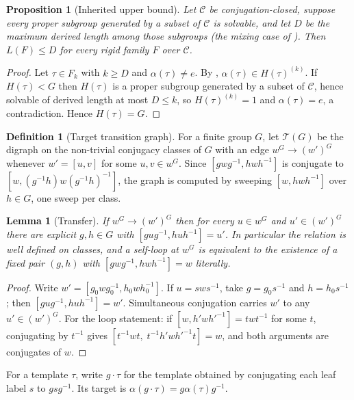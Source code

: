 \documentclass[11pt]{amsart}
\newtheorem{lemma}[lemma]{Lemma}
\newtheorem{proposition}[proposition]{Proposition}
\theoremstyle{definition}
\newtheorem{definition}[definition]{Definition}
\theoremstyle{remark}
\theoremstyle{plain}
\theoremstyle{plain}
\numberwithin{equation}{section}
\begin{document}
\begin{proposition}[Inherited upper bound]
\label{prop:rigidupper}
Let $\mathcal{C}$ be conjugation-closed, suppose every proper subgroup generated by a subset of
$\mathcal{C}$ is solvable, and let $D$ be the maximum derived length among those subgroups (the
mixing case of ). Then $L(F)\le D$ for every rigid family $F$ over
$\mathcal{C}$.
\end{proposition}
\begin{proof}
Let $\tau\in F_k$ with $k\ge D$ and $\alpha(\tau)\neq e$. By ,
$\alpha(\tau)\in H(\tau)^{(k)}$. If $H(\tau)<G$ then $H(\tau)$ is a proper subgroup generated by
a subset of $\mathcal{C}$, hence solvable of derived length at most $D\le k$, so
$H(\tau)^{(k)}=1$ and $\alpha(\tau)=e$, a contradiction. Hence $H(\tau)=G$.
\end{proof}

\begin{definition}[Target transition graph]
\label{def:targetgraph}
For a finite group $G$, let $\mathcal{T}(G)$ be the digraph on the non-trivial conjugacy classes
of $G$ with an edge $w^G\to(w')^G$ whenever $w'=[u,v]$ for some $u,v\in w^G$. Since
$[gwg^{-1},hwh^{-1}]$ is conjugate to $[w,(g^{-1}h)w(g^{-1}h)^{-1}]$, the graph is computed by
sweeping $[w,hwh^{-1}]$ over $h\in G$, one sweep per class.
\end{definition}

\begin{lemma}[Transfer]
\label{lem:classtransfer}
If $w^G\to(w')^G$ then for every $u\in w^G$ and $u'\in(w')^G$ there are explicit $g,h\in G$ with
$[gug^{-1},huh^{-1}]=u'$. In particular the relation is well defined on classes, and a self-loop
at $w^G$ is equivalent to the existence of a \emph{fixed} pair $(g,h)$ with
$[gwg^{-1},hwh^{-1}]=w$ literally.
\end{lemma}
\begin{proof}
Write $w'=[g_0wg_0^{-1},h_0wh_0^{-1}]$. If $u=sws^{-1}$, take
$g=g_0s^{-1}$ and $h=h_0s^{-1}$; then $[gug^{-1},huh^{-1}]=w'$.
Simultaneous conjugation carries $w'$ to any $u'\in(w')^G$.
For the loop statement: if $[w,h'wh'^{-1}]=twt^{-1}$ for some
$t$, conjugating by $t^{-1}$ gives $[t^{-1}wt,\;t^{-1}h'wh'^{-1}t]=w$, and both arguments are
conjugates of $w$.
\end{proof}

For a template $\tau$, write $g\cdot\tau$ for the template obtained by
conjugating each leaf label $s$ to $gsg^{-1}$. Its target is
$\alpha(g\cdot\tau)=g\alpha(\tau)g^{-1}$.
\end{document}
